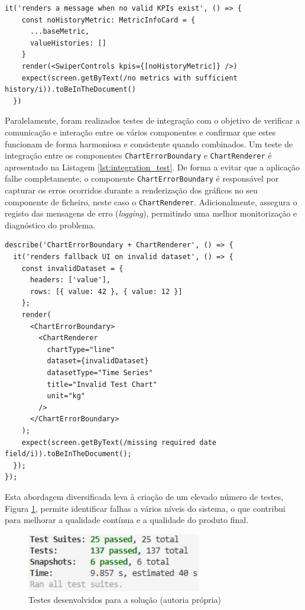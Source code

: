 \begin{lstlisting}[style=customts, caption={Teste unitáro ao componente \texttt{SwiperControls}}, label={lst:unit_test}]
it('renders a message when no valid KPIs exist', () => {
    const noHistoryMetric: MetricInfoCard = {
      ...baseMetric,
      valueHistories: []
    }
    render(<SwiperControls kpis={[noHistoryMetric]} />)
    expect(screen.getByText(/no metrics with sufficient history/i)).toBeInTheDocument()
  })
\end{lstlisting}

Paralelamente, foram realizados testes de integração com o objetivo de verificar a comunicação e interação entre os vários componentes e confirmar que estes funcionam de forma harmoniosa e consistente quando combinados. Um teste de integração entre os componentes \texttt{ChartErrorBoundary} e \texttt{ChartRenderer} é apresentado na Listagem \ref{lst:integration_test}. De forma a evitar que a aplicação falhe completamente, o componente \texttt{ChartErrorBoundary} é responsável por capturar os erros ocorridos durante a renderização dos gráficos no seu componente de ficheiro, neste caso o \texttt{ChartRenderer}. Adicionalmente, assegura o registo das mensagens de erro (\textit{logging}), permitindo uma melhor monitorização e diagnóstico do problema.

\begin{lstlisting}[style=customts, caption={Teste de integração entre \texttt{ChartErrorBoundary} e \texttt{ChartRenderer}}, label={lst:integration_test}]
describe('ChartErrorBoundary + ChartRenderer', () => {
  it('renders fallback UI on invalid dataset', () => {
    const invalidDataset = {
      headers: ['value'],
      rows: [{ value: 42 }, { value: 12 }]
    };
    render(
      <ChartErrorBoundary>
        <ChartRenderer
          chartType="line"
          dataset={invalidDataset}
          datasetType="Time Series"
          title="Invalid Test Chart"
          unit="kg"
        />
      </ChartErrorBoundary>
    );
    expect(screen.getByText(/missing required date field/i)).toBeInTheDocument();
  });
});
\end{lstlisting}

Esta abordagem diversificada leva à criação de um elevado número de testes, Figura \ref{fig:test_number}, permite identificar falhas a vários níveis do sistema, o que contribui para melhorar a qualidade contínua e a qualidade do produto final.

\begin{figure}[H]
    \centering
    \includegraphics[width=3in,keepaspectratio]{frontmatter/assets/tests/test_suits.png}
    \caption{Testes desenvolvidos para a solução (autoria própria)}
    \label{fig:test_number}
\end{figure}

